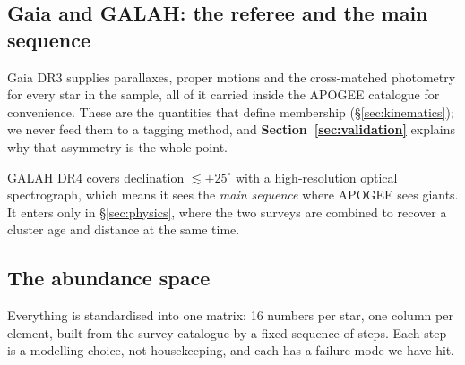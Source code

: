 \begin{marginnote}[] 
\end{marginnote}

\subsection{Gaia and GALAH: the referee and the main sequence}

Gaia DR3 \citep{Gaia:23} supplies parallaxes, proper motions and the
cross-matched photometry for every star in the sample, all of it carried
inside the APOGEE catalogue for convenience. These are the quantities that
define membership (\S\ref{sec:kinematics}); we never feed them to a
tagging method, and \textbf{Section~\ref{sec:validation}} explains why that
asymmetry is the whole point.

GALAH DR4 \citep{DeSilva:15, Buder:21} covers declination $\lesssim +25^\circ$
with a high-resolution optical spectrograph, which means it sees the
\emph{main sequence} where APOGEE sees giants. It enters only in
\S\ref{sec:physics}, where the two surveys are combined to recover a cluster
age and distance at the same time.

\subsection{The abundance space}

Everything is standardised into one matrix: 16 numbers per star, one column
per element, built from the survey catalogue by a fixed sequence of steps.
Each step is a modelling choice, not housekeeping, and each has a failure mode
we have hit.

